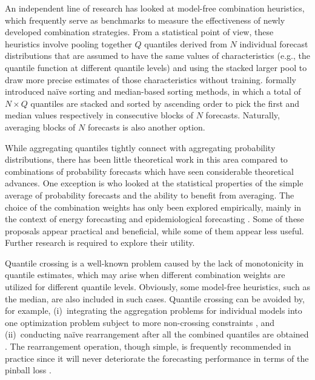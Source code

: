 \documentclass[a4paper,11pt]{article}
\begin{document}
An independent line of research has looked at model-free combination heuristics, which frequently serve as benchmarks to measure the effectiveness of newly developed combination strategies. From a statistical point of view, these heuristics involve pooling together $Q$ quantiles derived from $N$ individual forecast distributions that are assumed to have the same values of characteristics (e.g., the quantile function at different quantile levels) and using the stacked larger pool to draw more precise estimates of those characteristics without training. \citet{Wang2019-lx} formally introduced na\"{i}ve sorting and median-based sorting methods, in which a total of $N \times Q$ quantiles are stacked and sorted by ascending order to pick the first and median values respectively in consecutive blocks of $N$ forecasts. Naturally, averaging blocks of $N$ forecasts is also another option.

While aggregating quantiles tightly connect with aggregating probability distributions, there has been little theoretical work in this area compared to combinations of probability forecasts which have seen considerable theoretical advances. One exception is \citet{Lichtendahl2013-rt} who looked at the statistical properties of the simple average of probability forecasts and the ability to benefit from averaging. The choice of the combination weights has only been explored empirically, mainly in the context of energy forecasting \citep[e.g.,][]{Wang2019-lx,Browell2020-pa} and epidemiological forecasting \citep[e.g.,][]{Ray2022-co}. Some of these proposals appear practical and beneficial, while some of them appear less useful. Further research is required to explore their utility.

Quantile crossing is a well-known problem caused by the lack of monotonicity in quantile estimates, which may arise when different combination weights are utilized for different quantile levels. Obviously, some model-free heuristics, such as the median, are also included in such cases. Quantile crossing can be avoided by, for example, (i)~integrating the aggregation problems for individual models into one optimization problem subject to more non-crossing constraints \citep[e.g.,][]{Bondell2010-no,Kim2021-wa}, and (ii)~conducting na\"{i}ve rearrangement after all the combined quantiles are obtained \citep[e.g.,][]{Chernozhukov2010-zz,Berrisch2021-cr}. The rearrangement operation, though simple, is frequently recommended in practice since it will never deteriorate the forecasting performance in terms of the pinball loss \citep{Chernozhukov2010-zz}.
\end{document}
